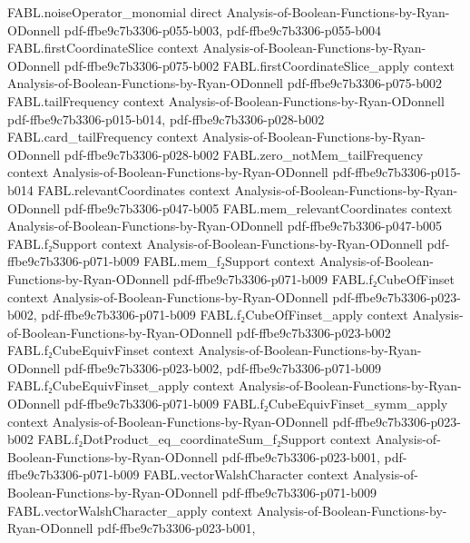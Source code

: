 \begin{theorem}
\proofstep
  {FABL.noiseOperator_monomial}
  {direct}
  {Analysis-of-Boolean-Functions-by-Ryan-ODonnell}
  {pdf-ffbe9c7b3306-p055-b003,
    pdf-ffbe9c7b3306-p055-b004}
\proofstep
  {FABL.firstCoordinateSlice}
  {context}
  {Analysis-of-Boolean-Functions-by-Ryan-ODonnell}
  {pdf-ffbe9c7b3306-p075-b002}
\proofstep
  {FABL.firstCoordinateSlice_apply}
  {context}
  {Analysis-of-Boolean-Functions-by-Ryan-ODonnell}
  {pdf-ffbe9c7b3306-p075-b002}
\proofstep
  {FABL.tailFrequency}
  {context}
  {Analysis-of-Boolean-Functions-by-Ryan-ODonnell}
  {pdf-ffbe9c7b3306-p015-b014,
    pdf-ffbe9c7b3306-p028-b002}
\proofstep
  {FABL.card_tailFrequency}
  {context}
  {Analysis-of-Boolean-Functions-by-Ryan-ODonnell}
  {pdf-ffbe9c7b3306-p028-b002}
\proofstep
  {FABL.zero_notMem_tailFrequency}
  {context}
  {Analysis-of-Boolean-Functions-by-Ryan-ODonnell}
  {pdf-ffbe9c7b3306-p015-b014}
\proofstep
  {FABL.relevantCoordinates}
  {context}
  {Analysis-of-Boolean-Functions-by-Ryan-ODonnell}
  {pdf-ffbe9c7b3306-p047-b005}
\proofstep
  {FABL.mem_relevantCoordinates}
  {context}
  {Analysis-of-Boolean-Functions-by-Ryan-ODonnell}
  {pdf-ffbe9c7b3306-p047-b005}
\proofstep
  {FABL.f₂Support}
  {context}
  {Analysis-of-Boolean-Functions-by-Ryan-ODonnell}
  {pdf-ffbe9c7b3306-p071-b009}
\proofstep
  {FABL.mem_f₂Support}
  {context}
  {Analysis-of-Boolean-Functions-by-Ryan-ODonnell}
  {pdf-ffbe9c7b3306-p071-b009}
\proofstep
  {FABL.f₂CubeOfFinset}
  {context}
  {Analysis-of-Boolean-Functions-by-Ryan-ODonnell}
  {pdf-ffbe9c7b3306-p023-b002,
    pdf-ffbe9c7b3306-p071-b009}
\proofstep
  {FABL.f₂CubeOfFinset_apply}
  {context}
  {Analysis-of-Boolean-Functions-by-Ryan-ODonnell}
  {pdf-ffbe9c7b3306-p023-b002}
\proofstep
  {FABL.f₂CubeEquivFinset}
  {context}
  {Analysis-of-Boolean-Functions-by-Ryan-ODonnell}
  {pdf-ffbe9c7b3306-p023-b002,
    pdf-ffbe9c7b3306-p071-b009}
\proofstep
  {FABL.f₂CubeEquivFinset_apply}
  {context}
  {Analysis-of-Boolean-Functions-by-Ryan-ODonnell}
  {pdf-ffbe9c7b3306-p071-b009}
\proofstep
  {FABL.f₂CubeEquivFinset_symm_apply}
  {context}
  {Analysis-of-Boolean-Functions-by-Ryan-ODonnell}
  {pdf-ffbe9c7b3306-p023-b002}
\proofstep
  {FABL.f₂DotProduct_eq_coordinateSum_f₂Support}
  {context}
  {Analysis-of-Boolean-Functions-by-Ryan-ODonnell}
  {pdf-ffbe9c7b3306-p023-b001,
    pdf-ffbe9c7b3306-p071-b009}
\proofstep
  {FABL.vectorWalshCharacter}
  {context}
  {Analysis-of-Boolean-Functions-by-Ryan-ODonnell}
  {pdf-ffbe9c7b3306-p071-b009}
\proofstep
  {FABL.vectorWalshCharacter_apply}
  {context}
  {Analysis-of-Boolean-Functions-by-Ryan-ODonnell}
  {pdf-ffbe9c7b3306-p023-b001,
}
\end{theorem}
